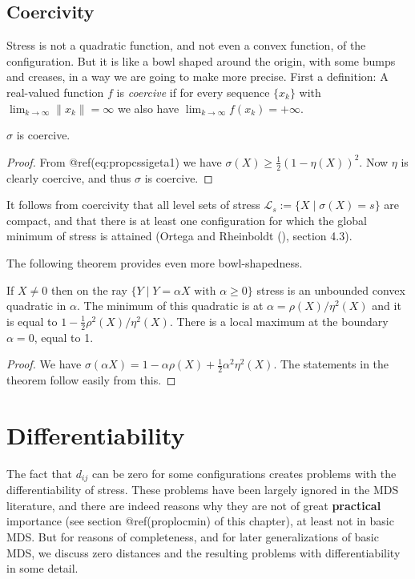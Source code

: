 \documentclass[
  12pt,
  letterpaper,
  DIV=11,
  numbers=noendperiod]{scrreprt}
\theoremstyle{remark}
\begin{document}
\subsection{Coercivity}\label{propcoercive}

Stress is not a quadratic function, and not even a convex function, of
the configuration. But it is like a bowl shaped around the origin, with
some bumps and creases, in a way we are going to make more precise.
First a definition: A real-valued function \(f\) is \emph{coercive} if
for every sequence \(\{x_k\}\) with
\(\lim_{k\rightarrow\infty}\|x_k\|=\infty\) we also have
\(\lim_{k\rightarrow\infty}f(x_k)=+\infty\).

\label{propcoerc}
\(\sigma\) is coercive.

\begin{proof}
From @ref(eq:propcssigeta1) we have
\(\sigma(X)\geq\frac12(1-\eta(X))^2\). Now \(\eta\) is clearly coercive,
and thus \(\sigma\) is coercive.
\end{proof}

It follows from coercivity that all level sets of stress
\(\mathcal{L}_s:=\{X\mid \sigma(X)=s\}\) are compact, and that there is
at least one configuration for which the global minimum of stress is
attained (Ortega and Rheinboldt
(), section 4.3).

The following theorem provides even more bowl-shapedness.

\label{rayquad}
If \(X\not=0\) then on the ray
\(\{Y\mid Y=\alpha X\text{ with }\alpha\geq 0\}\) stress is an unbounded
convex quadratic in \(\alpha\). The minimum of this quadratic is at
\(\alpha=\rho(X)/\eta^2(X)\) and it is equal to
\(1-\frac12\rho^2(X)/\eta^2(X)\). There is a local maximum at the
boundary \(\alpha=0\), equal to 1.

\begin{proof}
We have \(\sigma(\alpha X)=1-\alpha\rho(X)+\frac12\alpha^2\eta^2(X)\).
The statements in the theorem follow easily from this.
\end{proof}

\section{Differentiability}\label{propdiff}

The fact that \(d_{ij}\) can be zero for some configurations creates
problems with the differentiability of stress. These problems have been
largely ignored in the MDS literature, and there are indeed reasons why
they are not of great \textbf{practical} importance (see section
@ref(proplocmin) of this chapter), at least not in basic MDS. But for
reasons of completeness, and for later generalizations of basic MDS, we
discuss zero distances and the resulting problems with differentiability
in some detail.
\end{document}
